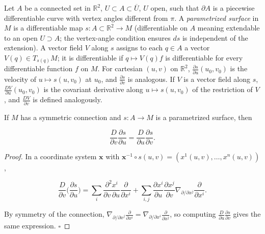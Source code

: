 \begin{definition}
  \label{def:dc-ch3-3-3}
  Let $A$ be a connected set in $\mathbb{R}^2$, $U\subset A\subset\overline{U}$, $U$
  open, such that $\partial A$ is a piecewise differentiable curve with vertex
  angles different from $\pi$. A \emph{parametrized surface} in $M$ is a differentiable
  map $s:A\subset\mathbb{R}^2\to M$ (differentiable on $A$ meaning extendable to an
  open $U\supset A$; the vertex-angle condition ensures $ds$ is independent of the
  extension). A vector field $V$ along $s$ assigns to each $q\in A$ a vector
  $V(q)\in T_{s(q)}M$; it is differentiable if $q\mapsto V(q)f$ is differentiable
  for every differentiable function $f$ on $M$. For cartesian $(u,v)$ on
  $\mathbb{R}^2$, $\frac{\partial s}{\partial u}(u_0,v_0)$ is the velocity of
  $u\mapsto s(u,v_0)$ at $u_0$, and $\frac{\partial s}{\partial v}$ is analogous.
  If $V$ is a vector field along $s$, $\frac{DV}{\partial u}(u_0,v_0)$ is the
  covariant derivative along $u\mapsto s(u,v_0)$ of the restriction of $V$, and
  $\frac{DV}{\partial v}$ is defined analogously.
\end{definition}

\begin{lemma}[symmetry]
  \label{lem:dc-ch3-3-4}
  \leanok
  If $M$ has a symmetric connection and $s:A\to M$ is a parametrized surface, then
  
  $$
  \frac{D}{\partial v}\frac{\partial s}{\partial u}=\frac{D}{\partial u}\frac{\partial s}{\partial v}.
  $$
\end{lemma}
\begin{proof}
  \leanok
  In a coordinate system $\mathbf{x}$ with
  $\mathbf{x}^{-1}\circ s(u,v)=(x^1(u,v),\dots,x^n(u,v))$,
  
  $$
  \frac{D}{\partial v}\Big(\frac{\partial s}{\partial u}\Big)=\sum_i\frac{\partial^2 x^i}{\partial v\,\partial u}\frac{\partial}{\partial x^i}+\sum_{i,j}\frac{\partial x^i}{\partial u}\frac{\partial x^j}{\partial v}\nabla_{\partial/\partial x^j}\frac{\partial}{\partial x^i}.
  $$
  
  By symmetry of the connection,
  $\nabla_{\partial/\partial x^j}\frac{\partial}{\partial x^i}=\nabla_{\partial/\partial x^i}\frac{\partial}{\partial x^j}$,
  so computing $\frac{D}{\partial u}\frac{\partial s}{\partial v}$ gives the same
  expression. $\square$
\end{proof}

